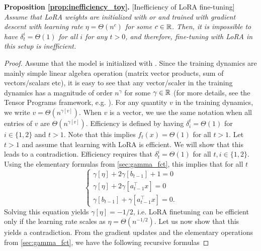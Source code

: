 \textbf{Proposition \ref{prop:inefficiency_toy}. }[Inefficiency of LoRA fine-tuning]
\emph{Assume that LoRA weights are initialized with  or  and trained with gradient descent with learning rate $\eta = \Theta(n^c)$ for some $c \in \mathbb{R}$. Then, it is impossible to have $\delta_t^i = \Theta(1)$ for all $i$ for any $t>0$, and therefore, fine-tuning with LoRA in this setup is inefficient.}

\begin{proof}
Assume that the model is initialized with . Since the training dynamics are mainly simple linear algebra operation (matrix vector products, sum of vectors/scalars etc), it is easy to see that any vector/scaler in the training dynamics has a magnitude of order $n^{\gamma}$ for some $\gamma \in \mathbb{R}$ (for more details, see the Tensor Programs framework, e.g. \cite{yang2019scaling}). For any quantity $v$ in the training dynamics, we write $v = \Theta(n^{\gamma[v]})$. When $v$ is a vector, we use the same notation when all entries of $v$ are $\Theta(n^{\gamma[v]})$. Efficiency is defined by having $\delta^t_i = \Theta(1)$ for $i \in \{1,2\}$ and $t>1$. Note that this implies $f_t(x) = \Theta(1)$ for all $t>1$. Let $t>1$ and assume that learning with LoRA is efficient. We will show that this leads to a contradiction. Efficiency requires that $\delta_t^i = \Theta(1)$ for all $t, i \in \{1,2\}$. Using the elementary formulas from \cref{sec:gamma_fct}, this implies that for all $t$
\begin{equation*}
    \begin{cases}
        \gamma[\eta]+2\gamma[b_{t-1}] + 1 = 0\\
        \gamma[\eta] + 2 \gamma[a_{t-1}^\top x] = 0\\
        \gamma[b_{t-1}] + \gamma[a_{t-1}^\top x] = 0.       
    \end{cases}
\end{equation*}
Solving this equation yields $\gamma[\eta] = -1/2$, i.e. LoRA finetuning can be efficient only if the learning rate scales as $\eta = \Theta(n^{-1/2})$. Let us now show that this yields a contradiction. From the gradient updates and the elementary operations from \cref{sec:gamma_fct}, we have the following recursive formulas


\end{proof}
